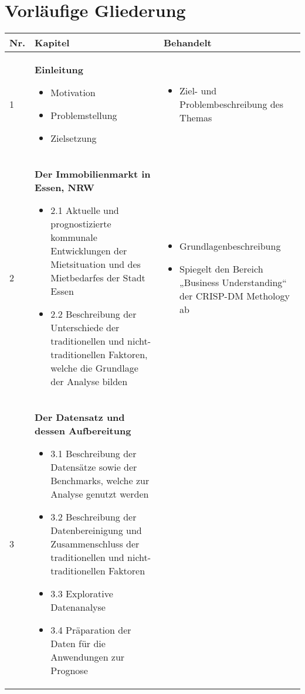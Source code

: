 \newpage
\section{Vorläufige Gliederung}

\begin{table}[H]
    \begin{tabularx}{\textwidth}[ht]{|l|X|X|}
      \hline
      \textbf{Nr.} & \textbf{Kapitel} & \textbf{Behandelt}\\
      \hline
      \hline
        1 & \textbf{Einleitung}

        \begin{itemize}
            \item Motivation
            \item Problemstellung
            \item Zielsetzung
        \end{itemize} 
        
        & \begin{itemize}
            \item Ziel- und Problembeschreibung des Themas
        \end{itemize}\\
        \hline\hline
        2 & \textbf{Der Immobilienmarkt in Essen, NRW} 
        
        \begin{itemize}
            \item 2.1 Aktuelle und prognostizierte kommunale Entwicklungen der Mietsituation 
            und des Mietbedarfes der Stadt Essen
            \item 2.2 Beschreibung der Unterschiede der traditionellen und 
            nicht-traditionellen Faktoren, welche die Grundlage der Analyse bilden
        \end{itemize}

        & \begin{itemize}
            \item Grundlagenbeschreibung
            \item Spiegelt den Bereich „Business Understanding“ der CRISP-DM Methology ab
        \end{itemize}\\
        \hline\hline
        3 & \textbf{Der Datensatz und dessen Aufbereitung} 
        
        \begin{itemize}
            \item 3.1 Beschreibung der Datensätze sowie der Benchmarks, welche zur 
            Analyse genutzt werden
            \item 3.2 Beschreibung der Datenbereinigung und Zusammenschluss der 
            traditionellen und nicht-traditionellen Faktoren
            \item 3.3 Explorative Datenanalyse
            \item 3.4 Präparation der Daten für die Anwendungen zur Prognose
        \end{itemize}
        

\end{tabularx}
\end{table}
